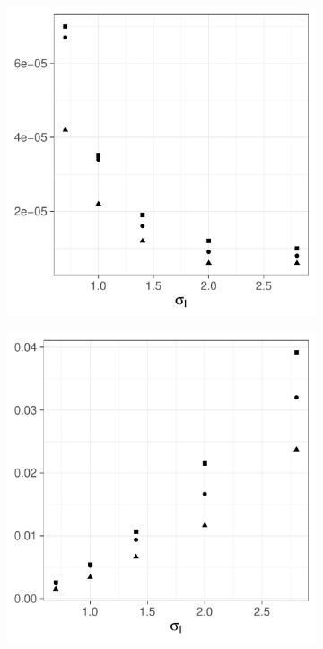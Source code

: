 \begin{figure}[htbp]
    \centering
    \begin{subfigure}[t]{0.49\textwidth}
        \includegraphics[width=\textwidth]{results/by_cases_spread/MISE-vs-risk-spread}
        \caption{}
        \label{fig:ise:unif_Spreads_1h:mise}
    \end{subfigure}
    \begin{subfigure}[t]{0.49\textwidth}
        \includegraphics[width=\textwidth]{results/by_cases_spread/RMISE-vs-risk-spread}
        \caption{}
        \label{fig:ise:unif_Spreads_1h:rmise}
    \end{subfigure}


\end{figure}
